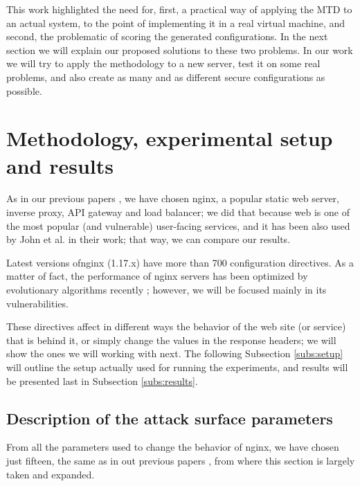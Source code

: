 \documentclass[sigconf]{acmart}
\begin{document}
This work highlighted the need for, first, a practical way of applying the MTD
to an actual system, to the point of implementing it in a real virtual
machine, and second, the problematic of scoring the generated
configurations. In the next section we will explain our proposed
solutions to these two problems. In our work we will try to apply the
methodology to a new server, test it on some real problems, and also
create as many and as different secure configurations as possible.


\section{Methodology, experimental setup and results}
\label{sec:met}


As in our previous papers \cite{erseco:evostar:anon,erseco:cec}, we have chosen
{\sf nginx}, a  popular static web server, inverse proxy, API gateway
and load balancer; we did that because web is one of the most popular
(and vulnerable) user-facing services, and it has been also used by
John et al. in their work; that way, we can compare our results.

Latest versions
of{\sf nginx} (1.17.x) have more than 700 configuration
directives. As a matter of fact, the performance of {\sf nginx}
servers has been optimized by  evolutionary algorithms recently
\cite{chi2018hybrid}; however, we will be focused mainly in its
vulnerabilities.


These directives affect in different ways the behavior of
the web site (or service) that is behind it, or simply change the
values in the response headers; we will show the ones we will working
with next. The following Subsection \ref{subs:setup}
will outline the setup actually used for running the experiments, and
results will be presented last in Subsection \ref{subs:results}.

\subsection{Description of the attack surface parameters}

From all the parameters used to change the behavior of {\sf nginx}, we
have chosen just fifteen, the same as in out previous papers
\cite{erseco:evostar:anon,erseco:cec}, from where this section is largely taken
and expanded.
\end{document}
